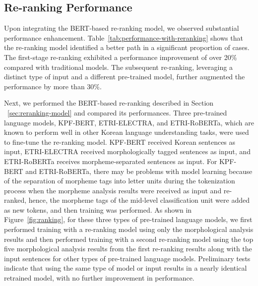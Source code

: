 \documentclass[AMS,STIX2COL]{WileyNJD-v2}
\begin{document}
    \subsection{Re-ranking Performance}\label{subsec:reranking-performance}

    Upon integrating the BERT-based re-ranking model, we observed substantial performance enhancement.
    Table~\ref{tab:performance-with-reranking} shows that the re-ranking model identified a better path in a significant proportion of cases.
    The first-stage re-ranking exhibited a performance improvement of over 20\% compared with traditional models.
    The subsequent re-ranking, leveraging a distinct type of input and a different pre-trained model, further augmented the performance by more than 30\%.

    Next, we performed the BERT-based re-ranking described in Section ~\ref{sec:reranking-model} and compared its performances.
    Three pre-trained language models, KPF-BERT, ETRI-ELECTRA, and ETRI-RoBERTa, which are known to perform well in other Korean language understanding tasks, were used to fine-tune the re-ranking model.
    KPF-BERT received Korean sentences as input, ETRI-ELECTRA received morphologically tagged sentences as input, and ETRI-RoBERTa receives morpheme-separated sentences as input.
    For KPF-BERT and ETRI-RoBERTa, there may be problems with model learning because of the separation of morpheme tags into letter units during the tokenization process when the morpheme analysis results were received as input and re-ranked, hence, the morpheme tags of the mid-level classification unit were added as new tokens, and then training was performed.
    As shown in Figure~\ref{fig:ranking}, for these three types of pre-trained language models, we first performed training with a re-ranking model using only the morphological analysis results and then performed training with a second re-ranking model using the top five morphological analysis results from the first re-ranking results along with the input sentences for other types of pre-trained language models.
    Preliminary tests indicate that using the same type of model or input results in a nearly identical retrained model, with no further improvement in performance.
\end{document}

